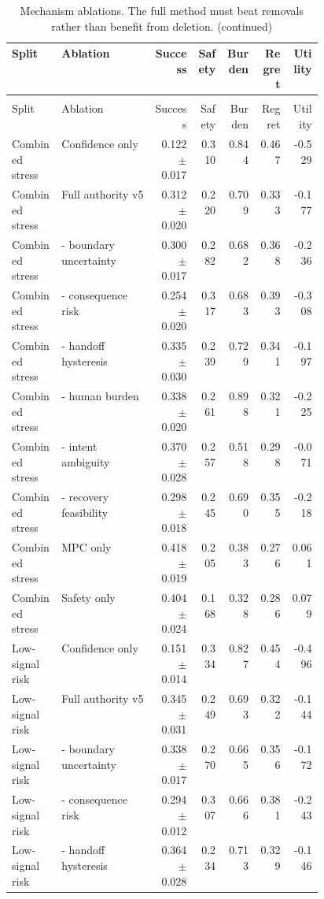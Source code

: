 \documentclass{article}
\begin{document}
\begin{center}
\scriptsize
\begin{longtable}{p{0.16\linewidth}p{0.30\linewidth}rrrrr}
\caption{Mechanism ablations. The full method must beat removals rather than benefit from deletion.}\label{tab:ablation}\\
\toprule
Split & Ablation & Success & Safety & Burden & Regret & Utility\\
\midrule
\endfirsthead
\caption[]{Mechanism ablations. The full method must beat removals rather than benefit from deletion. (continued)}\\
\toprule
Split & Ablation & Success & Safety & Burden & Regret & Utility\\
\midrule
\endhead
Combined stress & Confidence only & 0.122 $\pm$ 0.017 & 0.310 & 0.844 & 0.467 & -0.529\\
Combined stress & Full authority v5 & 0.312 $\pm$ 0.020 & 0.220 & 0.709 & 0.333 & -0.177\\
Combined stress & - boundary uncertainty & 0.300 $\pm$ 0.017 & 0.282 & 0.682 & 0.368 & -0.236\\
Combined stress & - consequence risk & 0.254 $\pm$ 0.020 & 0.317 & 0.683 & 0.393 & -0.308\\
Combined stress & - handoff hysteresis & 0.335 $\pm$ 0.030 & 0.239 & 0.729 & 0.341 & -0.197\\
Combined stress & - human burden & 0.338 $\pm$ 0.020 & 0.261 & 0.898 & 0.321 & -0.225\\
Combined stress & - intent ambiguity & 0.370 $\pm$ 0.028 & 0.257 & 0.518 & 0.298 & -0.071\\
Combined stress & - recovery feasibility & 0.298 $\pm$ 0.018 & 0.245 & 0.690 & 0.355 & -0.218\\
Combined stress & MPC only & 0.418 $\pm$ 0.019 & 0.205 & 0.383 & 0.276 & 0.061\\
Combined stress & Safety only & 0.404 $\pm$ 0.024 & 0.168 & 0.328 & 0.286 & 0.079\\
Low-signal risk & Confidence only & 0.151 $\pm$ 0.014 & 0.334 & 0.827 & 0.454 & -0.496\\
Low-signal risk & Full authority v5 & 0.345 $\pm$ 0.031 & 0.249 & 0.693 & 0.322 & -0.144\\
Low-signal risk & - boundary uncertainty & 0.338 $\pm$ 0.017 & 0.270 & 0.665 & 0.356 & -0.172\\
Low-signal risk & - consequence risk & 0.294 $\pm$ 0.012 & 0.307 & 0.666 & 0.381 & -0.243\\
Low-signal risk & - handoff hysteresis & 0.364 $\pm$ 0.028 & 0.234 & 0.713 & 0.329 & -0.146\\

\end{longtable}
\end{center}
\end{document}

